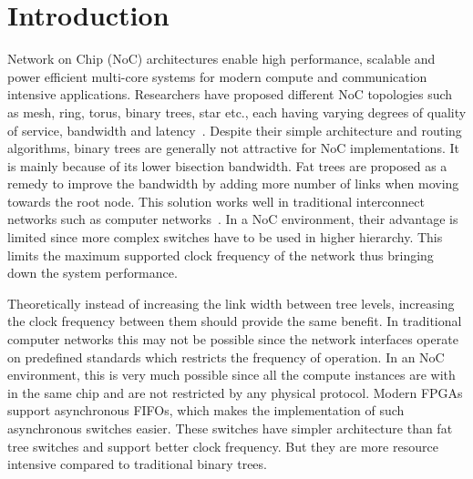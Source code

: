 \section{Introduction}
Network on Chip (NoC) architectures enable high performance, scalable and power efficient multi-core systems for modern compute and communication intensive applications.
Researchers have proposed different NoC topologies such as mesh, ring, torus, binary trees, star etc., each having varying degrees of quality of service, bandwidth and latency~\cite{Dally2003}.
Despite their simple architecture and routing algorithms, binary trees are generally not attractive for NoC implementations.
It is mainly because of its lower bisection bandwidth.
Fat trees are proposed as a remedy to improve the bandwidth by adding more number of links when moving towards the root node.
This solution works well in traditional interconnect networks such as computer networks~\cite{Shainer2011}.
In a NoC environment, their advantage is limited since more complex switches have to be used in higher hierarchy.
This limits the maximum supported clock frequency of the network thus bringing down the system performance. 

Theoretically instead of increasing the link width between tree levels, increasing the clock frequency between them should provide the same benefit.
In traditional computer networks this may not be possible since the network interfaces operate on predefined standards which restricts the frequency of operation.
In an NoC environment, this is very much possible since all the compute instances are with in the same chip and are not restricted by any physical protocol. 
Modern FPGAs support asynchronous FIFOs, which makes the implementation of such asynchronous switches easier.
These switches have simpler architecture than fat tree switches and support better clock frequency.
But they are more resource intensive compared to traditional binary trees.

